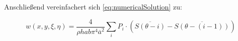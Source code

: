 Anschließend vereinfachert sich \ref{eq:numericalSolution} zu:

\begin{equation}
w(x,y,\xi, \eta) = \frac{4}{\rho h a b \pi^4 \overline{a}^2} \sum_i P_i \cdot (\overline{S(\theta - i)} - \overline{S(\theta - (i-1))})
\end{equation}




